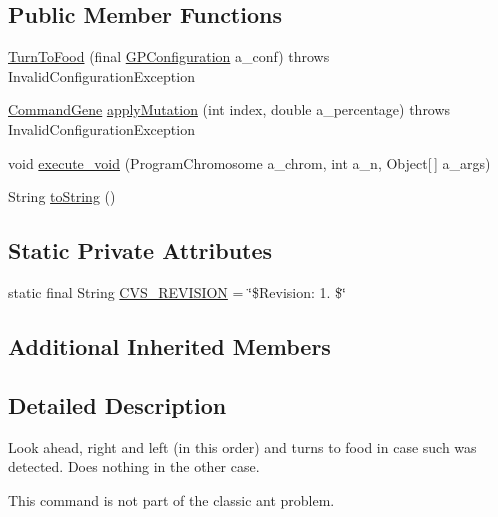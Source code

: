 \subsection*{Public Member Functions}
\begin{DoxyCompactItemize}
\item 
\hyperlink{classexamples_1_1gp_1_1anttrail_1_1_turn_to_food_a44fbd431126ed84d9b896a1eb2dd2953}{Turn\-To\-Food} (final \hyperlink{classorg_1_1jgap_1_1gp_1_1impl_1_1_g_p_configuration}{G\-P\-Configuration} a\-\_\-conf)  throws Invalid\-Configuration\-Exception 
\item 
\hyperlink{classorg_1_1jgap_1_1gp_1_1_command_gene}{Command\-Gene} \hyperlink{classexamples_1_1gp_1_1anttrail_1_1_turn_to_food_ab7ba11ef3db37ac79a2e4c8aba8e8205}{apply\-Mutation} (int index, double a\-\_\-percentage)  throws Invalid\-Configuration\-Exception 
\item 
void \hyperlink{classexamples_1_1gp_1_1anttrail_1_1_turn_to_food_aee13bf37f5d6fa6dd6c7bd1242c1a493}{execute\-\_\-void} (Program\-Chromosome a\-\_\-chrom, int a\-\_\-n, Object\mbox{[}$\,$\mbox{]} a\-\_\-args)
\item 
String \hyperlink{classexamples_1_1gp_1_1anttrail_1_1_turn_to_food_a4a4a2697df7616fee6735a4effd25b83}{to\-String} ()
\end{DoxyCompactItemize}
\subsection*{Static Private Attributes}
\begin{DoxyCompactItemize}
\item 
static final String \hyperlink{classexamples_1_1gp_1_1anttrail_1_1_turn_to_food_afb0d4b4bc2811983a1426c18658db00e}{C\-V\-S\-\_\-\-R\-E\-V\-I\-S\-I\-O\-N} = \char`\"{}\$Revision\-: 1. \$\char`\"{}
\end{DoxyCompactItemize}
\subsection*{Additional Inherited Members}


\subsection{Detailed Description}
Look ahead, right and left (in this order) and turns to food in case such was detected. Does nothing in the other case.

This command is not part of the classic ant problem.

